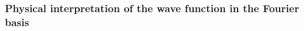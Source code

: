 \documentclass[
pra%
,preprint%
,amssymb, nobibnotes, aps, superscriptaddress, floatfix]{revtex4}
\renewcommand{\imath}{\mathrm{i}}
\newcommand{\rv}{\mathbf{r}}
\newcommand{\av}{\boldsymbol{\alpha}}
\newcommand{\kv}{\mathbf{k}}
\newcommand{\khsub}{\mathrm{KH}}
\newcommand{\phase}{\phi}
\newcommand{\psit}{\widetilde{\psi}}
\newcommand{\Vt}{\widetilde{V}}
\newcommand{\Vidx}[1]{\Vt_{#1}}
\newcommand{\Vkp}{\Vt(\kv-\kv')} %
\newcommand{\Pidx}[1]{\psit_{#1}}
\newcommand{\Pmk}{\Pidx{m}(\kv, t)} %
\newcommand{\Pmkp}{\Pidx{m}(\kv', t)}
\begin{document}

\subsubsection{Physical interpretation of the wave function in the Fourier basis}
\end{document}
